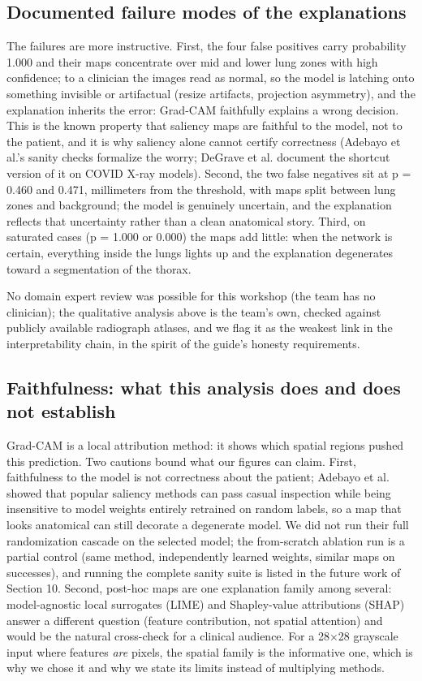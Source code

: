 \documentclass[11pt,a4paper]{article}
\begin{document}
\subsection{Documented failure modes of the explanations}

The failures are more instructive. First, the four false positives carry probability 1.000 and their maps concentrate over mid and lower lung zones with high confidence; to a clinician the images read as normal, so the model is latching onto something invisible or artifactual (resize artifacts, projection asymmetry), and the explanation inherits the error: Grad-CAM faithfully explains a wrong decision. This is the known property that saliency maps are faithful to the model, not to the patient, and it is why saliency alone cannot certify correctness (Adebayo et al.'s sanity checks formalize the worry; DeGrave et al. document the shortcut version of it on COVID X-ray models). Second, the two false negatives sit at p = 0.460 and 0.471, millimeters from the threshold, with maps split between lung zones and background; the model is genuinely uncertain, and the explanation reflects that uncertainty rather than a clean anatomical story. Third, on saturated cases (p = 1.000 or 0.000) the maps add little: when the network is certain, everything inside the lungs lights up and the explanation degenerates toward a segmentation of the thorax.

No domain expert review was possible for this workshop (the team has no clinician); the qualitative analysis above is the team's own, checked against publicly available radiograph atlases, and we flag it as the weakest link in the interpretability chain, in the spirit of the guide's honesty requirements.

\subsection{Faithfulness: what this analysis does and does not establish}

Grad-CAM is a local attribution method: it shows which spatial regions pushed this prediction. Two cautions bound what our figures can claim. First, faithfulness to the model is not correctness about the patient; Adebayo et al. showed that popular saliency methods can pass casual inspection while being insensitive to model weights entirely retrained on random labels, so a map that looks anatomical can still decorate a degenerate model. We did not run their full randomization cascade on the selected model; the from-scratch ablation run is a partial control (same method, independently learned weights, similar maps on successes), and running the complete sanity suite is listed in the future work of Section 10. Second, post-hoc maps are one explanation family among several: model-agnostic local surrogates (LIME) and Shapley-value attributions (SHAP) answer a different question (feature contribution, not spatial attention) and would be the natural cross-check for a clinical audience. For a 28$\times$28 grayscale input where features \emph{are} pixels, the spatial family is the informative one, which is why we chose it and why we state its limits instead of multiplying methods.
\end{document}
